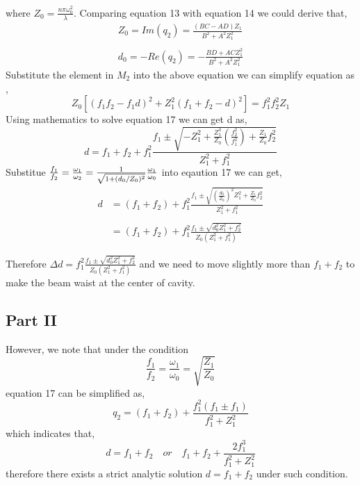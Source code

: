 \documentclass{article}
\begin{document}
where $Z_0=\frac{n\pi\omega_0^2}{\lambda}$. Comparing equation 13 with equation 14 we could derive that,
\begin{equation}\label{key}
	\begin{array}{l}
		Z_0=Im(q_2)=\frac{(BC-AD)Z_1}{B^2+A^2Z_1^2}\\
		\\
		d_0=-Re(q_2)=-\frac{BD+ACZ_1^2}{B^2+A^2Z_1^2}
	\end{array}
\end{equation}
Substitute the element in $M_2$ into the above equation we can simplify equation as ,
\begin{equation}\label{key}
	Z_0[(f_1f_2-f_1d)^2+Z_1^2(f_1+f_2-d)^2]=f_1^2f_2^2Z_1
\end{equation}
Using mathematics to solve equation 17 we can get d as,
\begin{equation}\label{key}
	d=f_1+f_2+f_1^2\frac{f_1\pm\sqrt{-Z_1^2+\frac{Z_1^3}{Z_0}(\frac{f_2^2}{f_1^2})+\frac{Z_1}{Z_0}f_2^2}}{Z_1^2+f_1^2}
\end{equation}
Substitue  $\frac{f_1}{f_2}=\frac{\omega_1}{\omega_2}=\frac{1}{\sqrt{1+(d_0\//Z_0)^2}}\frac{\omega_1}{\omega_0}$ into eqaution 17 we can get,
\begin{equation}\label{key}
    \begin{aligned}
     d&=(f_1+f_2)+f_1^2\frac{f_1\pm\sqrt{(\frac{d_0}{Z_0})^2Z_1^2+\frac{Z_1}{Z_0}f_2^2}}{Z_1^2+f_1^2}\\
     \\
     &=(f_1+f_2)+f_1^2\frac{f_1\pm\sqrt{d_0^2Z_1^2+f_2^2}}{Z_0(Z_1^2+f_1^2)}
    \end{aligned}
\end{equation}

Therefore $\Delta d=f_1^2\frac{f_1\pm\sqrt{d_0^2Z_1^2+f_2^2}}{Z_0(Z_1^2+f_1^2)}$ and we need to move slightly more than $f_1+f_2$ to make the beam waist at the center of cavity.
\subsection{Part II}
However, we note that under the condition
$$
	\frac{f_1}{f_2}=\frac{\omega_1}{\omega_0}=\sqrt{\frac{Z_1}{Z_0}}
$$
equation 17 can be simplified as,
\begin{equation}\label{key}
	q_2=(f_1+f_2)+\frac{f_1^2(f_1\pm f_1)}{f_1^2+Z_1^2}
\end{equation}
which indicates that,
\begin{equation}\label{key}
	d=f_1+f_2 \quad or\quad  f_1+f_2+\frac{2f_1^3}{f_1^2+Z_1^2}
\end{equation}
therefore there exists a strict analytic solution $d=f_1+f_2$ under such condition.
\end{document}
